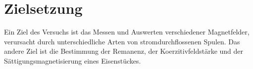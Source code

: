 \section{Zielsetzung}
\label{sec:Zielsetzung}
Ein Ziel des Versuchs ist das Messen und Auswerten verschiedener Magnetfelder, verursacht
durch unterschiedliche Arten von stromdurchflossenen Spulen.
Das andere Ziel ist die Bestimmung der Remanenz, der Koerzitivfeldstärke und der Sättigungsmagnetisierung 
eines Eisenstückes.
